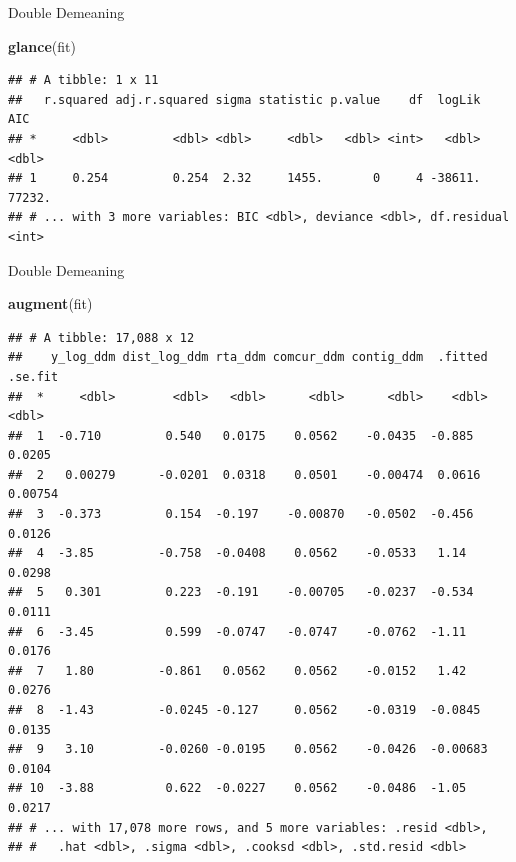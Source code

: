 \documentclass[ignorenonframetext,compress,aspectratio=169]{beamer}
\newenvironment{Shaded}{\begin{snugshade}}{\end{snugshade}}
\newcommand{\KeywordTok}[1]{\textcolor[rgb]{0.13,0.29,0.53}{\textbf{#1}}}
\newcommand{\NormalTok}[1]{#1}
\begin{document}
\begin{frame}[fragile]{Double Demeaning}

\begin{Shaded}
\begin{Highlighting}[]
\KeywordTok{glance}\NormalTok{(fit)}
\end{Highlighting}
\end{Shaded}

\begin{verbatim}
## # A tibble: 1 x 11
##   r.squared adj.r.squared sigma statistic p.value    df  logLik    AIC
## *     <dbl>         <dbl> <dbl>     <dbl>   <dbl> <int>   <dbl>  <dbl>
## 1     0.254         0.254  2.32     1455.       0     4 -38611. 77232.
## # ... with 3 more variables: BIC <dbl>, deviance <dbl>, df.residual <int>
\end{verbatim}

\end{frame}

\begin{frame}[fragile]{Double Demeaning}

\begin{Shaded}
\begin{Highlighting}[]
\KeywordTok{augment}\NormalTok{(fit)}
\end{Highlighting}
\end{Shaded}

\begin{verbatim}
## # A tibble: 17,088 x 12
##    y_log_ddm dist_log_ddm rta_ddm comcur_ddm contig_ddm  .fitted .se.fit
##  *     <dbl>        <dbl>   <dbl>      <dbl>      <dbl>    <dbl>   <dbl>
##  1  -0.710         0.540   0.0175    0.0562    -0.0435  -0.885   0.0205 
##  2   0.00279      -0.0201  0.0318    0.0501    -0.00474  0.0616  0.00754
##  3  -0.373         0.154  -0.197    -0.00870   -0.0502  -0.456   0.0126 
##  4  -3.85         -0.758  -0.0408    0.0562    -0.0533   1.14    0.0298 
##  5   0.301         0.223  -0.191    -0.00705   -0.0237  -0.534   0.0111 
##  6  -3.45          0.599  -0.0747   -0.0747    -0.0762  -1.11    0.0176 
##  7   1.80         -0.861   0.0562    0.0562    -0.0152   1.42    0.0276 
##  8  -1.43         -0.0245 -0.127     0.0562    -0.0319  -0.0845  0.0135 
##  9   3.10         -0.0260 -0.0195    0.0562    -0.0426  -0.00683 0.0104 
## 10  -3.88          0.622  -0.0227    0.0562    -0.0486  -1.05    0.0217 
## # ... with 17,078 more rows, and 5 more variables: .resid <dbl>,
## #   .hat <dbl>, .sigma <dbl>, .cooksd <dbl>, .std.resid <dbl>
\end{verbatim}

\end{frame}
\end{document}
